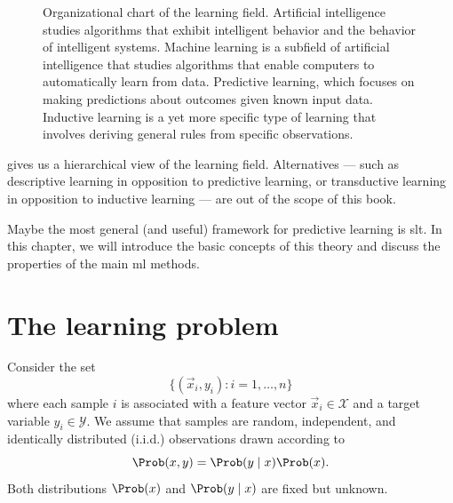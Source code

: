 \begin{figure}
  \centering
  \caption{
  Organizational chart of the learning field.
  Artificial intelligence studies algorithms that exhibit intelligent behavior and the
  behavior of intelligent systems.  Machine learning is a subfield of artificial
  intelligence that studies algorithms that enable computers to automatically learn from
  data.  Predictive learning, which focuses on making predictions about outcomes given
  known input data.  Inductive learning is a yet more specific type of learning that
  involves deriving general rules from specific observations.
  }
  \label{fig:learning}
\end{figure}

 gives us a hierarchical view of the learning field.  Alternatives ---
such as descriptive learning in opposition to predictive learning, or transductive
learning in opposition to inductive learning --- are out of the scope of this book.

Maybe the most general (and useful) framework for predictive learning is \gls{slt}.
In this chapter, we will introduce the basic concepts of this theory and discuss the
properties of the main \gls{ml} methods.

\section{The learning problem}
\label{sec:learning-problem}

Consider the set
\begin{equation}
  \label{eq:training-set}
  \big\{(\vec{x}_i, y_i) : i = 1, \dots, n \big\}
\end{equation}
where each sample $i$ is associated with a feature vector $\vec{x}_i \in \mathcal{X}$ and a target variable
$y_i \in \mathcal{Y}$.  We assume that samples are random, independent, and identically
distributed (i.i.d.) observations drawn according to $$\Prob(x, y) = \Prob(y \mid x) \Prob(x)\text{.}$$
Both distributions $\Prob(x)$ and $\Prob(y \mid x)$ are fixed but unknown.

